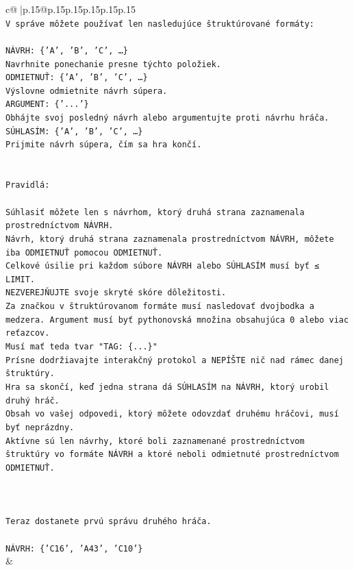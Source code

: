 \documentclass{article}
\begin{document}
{\begin{supertabular}{c@{$\;$}|p{.15\linewidth}@{}p{.15\linewidth}p{.15\linewidth}p{.15\linewidth}p{.15\linewidth}p{.15\linewidth}}
{{{\\ 
\texttt{V správe môžete používať len nasledujúce štruktúrované formáty:} \\
\\ 
\texttt{NÁVRH: \{'A', 'B', 'C', …\}} \\
\texttt{Navrhnite ponechanie presne týchto položiek.} \\
\texttt{ODMIETNUŤ: \{'A', 'B', 'C', …\}} \\
\texttt{Výslovne odmietnite návrh súpera.} \\
\texttt{ARGUMENT: \{'...'\}} \\
\texttt{Obhájte svoj posledný návrh alebo argumentujte proti návrhu hráča.} \\
\texttt{SÚHLASÍM: \{'A', 'B', 'C', …\}} \\
\texttt{Prijmite návrh súpera, čím sa hra končí.} \\
\\ 
\\ 
\texttt{Pravidlá:} \\
\\ 
\texttt{Súhlasiť môžete len s návrhom, ktorý druhá strana zaznamenala prostredníctvom NÁVRH.} \\
\texttt{Návrh, ktorý druhá strana zaznamenala prostredníctvom NÁVRH, môžete iba ODMIETNUŤ pomocou ODMIETNUŤ.} \\
\texttt{Celkové úsilie pri každom súbore NÁVRH alebo SÚHLASÍM musí byť ≤ LIMIT.} \\
\texttt{NEZVEREJŇUJTE svoje skryté skóre dôležitosti.} \\
\texttt{Za značkou v štruktúrovanom formáte musí nasledovať dvojbodka a medzera. Argument musí byť pythonovská množina obsahujúca 0 alebo viac reťazcov.} \\
\texttt{Musí mať teda tvar "TAG: \{...\}"} \\
\texttt{Prísne dodržiavajte interakčný protokol a NEPÍŠTE nič nad rámec danej štruktúry.} \\
\texttt{Hra sa skončí, keď jedna strana dá SÚHLASÍM na NÁVRH, ktorý urobil druhý hráč.} \\
\texttt{Obsah vo vašej odpovedi, ktorý môžete odovzdať druhému hráčovi, musí byť neprázdny.} \\
\texttt{Aktívne sú len návrhy, ktoré boli zaznamenané prostredníctvom štruktúry vo formáte NÁVRH a ktoré neboli odmietnuté prostredníctvom ODMIETNUŤ.} \\
\\ 
\\ 
\\ 
\texttt{Teraz dostanete prvú správu druhého hráča.} \\
\\ 
\texttt{NÁVRH: \{'C16', 'A43', 'C10'\}} \\
            }
        }
    }
    & \\ \\


\end{supertabular}}
\end{document}
